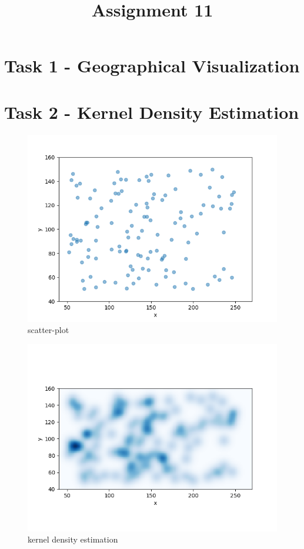 \documentclass[a4paper]{article}
\date{}
\author{}
\title{\textbf{Assignment 11}}
\begin{document}
\maketitle 
\thispagestyle{fancy}

\section*{Task 1 - Geographical Visualization}
\section*{Task 2 - Kernel Density Estimation}
\begin{figure}[th!]
	\centering
	\includegraphics[width=0.7\linewidth]{scatter}
	\caption{scatter-plot}
	\label{fig:scatter}
\end{figure}

\begin{figure}[th!]
	\centering
	\includegraphics[width=0.7\linewidth]{density}
	\caption{kernel density estimation}
	\label{fig:density}
\end{figure}
\end{document}
